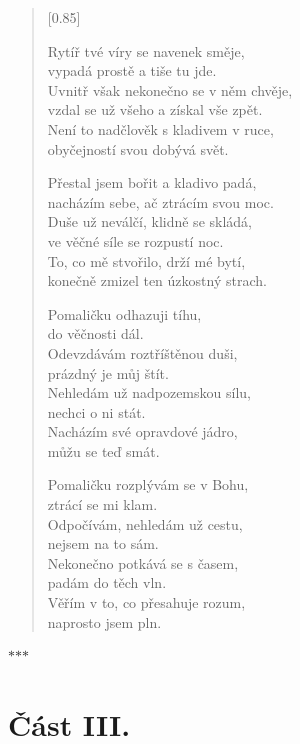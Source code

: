 \documentclass[12pt, a4paper]{article}
\newcommand{\ornament}{
    \vspace{1.5em}
    \begin{center}
        $\ast$\quad$\ast$\quad$\ast$
    \end{center}
    \vspace{1.5em}
}
\begin{document}
\begin{verse}[0.85\textwidth]
\vspace{1em}

Rytíř tvé víry se navenek směje, \\
vypadá prostě a tiše tu jde. \\
Uvnitř však nekonečno se v něm chvěje, \\
vzdal se už všeho a získal vše zpět. \\
Není to nadčlověk s kladivem v ruce, \\
obyčejností svou dobývá svět.

\vspace{1em}

Přestal jsem bořit a kladivo padá, \\
nacházím sebe, ač ztrácím svou moc. \\
Duše už neválčí, klidně se skládá, \\
ve věčné síle se rozpustí noc. \\
To, co mě stvořilo, drží mé bytí, \\
konečně zmizel ten úzkostný strach.

\vspace{1em}
\newpage

Pomaličku odhazuji tíhu, \\
do věčnosti dál. \\
Odevzdávám roztříštěnou duši, \\
prázdný je můj štít. \\
Nehledám už nadpozemskou sílu, \\ 
nechci o ni stát. \\
Nacházím své opravdové jádro, \\
můžu se teď smát.

\vspace{1em}


Pomaličku rozplývám se v Bohu, \\
ztrácí se mi klam. \\
Odpočívám, nehledám už cestu, \\
nejsem na to sám. \\
Nekonečno potkává se s časem, \\
padám do těch vln. \\
Věřím v to, co přesahuje rozum, \\
naprosto jsem pln.

\end{verse}

\ornament

\section*{Část III.}
\end{document}
